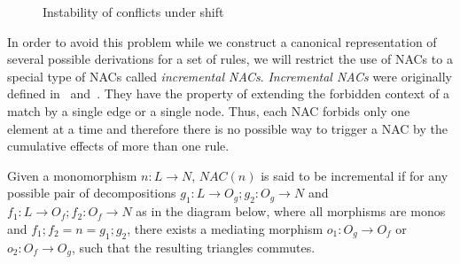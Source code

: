 \begin{figure}[!ht]
  \centering
  \caption{Instability of conflicts under shift\\}\label{fig:process:instability}
\end{figure}

In order to avoid this problem while we construct a canonical representation of several possible derivations for a set of rules, we will restrict the use of NACs to a special type of NACs called \emph{incremental NACs}.
\emph{Incremental NACs} were originally defined in~\cite{Corradini2013} and~\cite{Corradini2014}. They have the property of extending the forbidden context of a match by a single edge or a single node. Thus, each NAC forbids only one element at a time and therefore there is no possible way to trigger a NAC by the cumulative effects of more than one rule.

\begin{definition} Given a monomorphism \mbox{$n : L \rightarrow N$}, $NAC(n)$ is said to be incremental if for any possible pair of decompositions \mbox{$g_1 : L \rightarrow O_g;g_2 : O_g \rightarrow N$} and \mbox{$f_1 : L \rightarrow O_f;f_2 : O_f \rightarrow N$} as in the diagram below, where all morphisms are monos and \mbox{$f_1;f_2 = n = g_1;g_2$}, there exists a mediating morphism $o_1 : O_g \rightarrow O_f$ or $o_2 : O_f \rightarrow O_g$, such that the resulting triangles
  commutes.


\end{definition}

